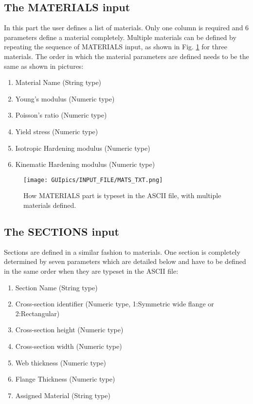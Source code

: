 \subsection{The MATERIALS input}
In this part the user defines a list of materials. Only one column is required 
and 6 parameters define a material completely. Multiple materials can be 
defined by repeating the sequence of MATERIALS input, as shown in Fig. 
\ref{fig:MATS} for three materials. The order in which the material parameters 
are defined needs to be the same as shown in pictures: 
\begin{enumerate}
	\item Material Name (String type)
	\item Young's modulus (Numeric type)
	\item Poisson's ratio (Numeric type)
	\item Yield stress (Numeric type)
	\item Isotropic Hardening modulus (Numeric type)
	\item Kinematic Hardening modulus (Numeric type)
\end{enumerate}

\begin{figure}[t]
	\centering
	\texttt{[image: GUIpics/INPUT\_FILE/MATS\_TXT.png]}
	\caption{How MATERIALS part is typeset in the ASCII file, with multiple 
	materials defined.}
	\label{fig:MATS}
\end{figure}

\subsection{The SECTIONS input}

Sections are defined in a similar fashion to materials. One section is 
completely determined by seven parameters which are detailed below and have to 
be defined in the same order when they are typeset in the ASCII file:

\begin{enumerate}
	\item Section Name (String type)
	\item Cross-section identifier (Numeric type, 1:Symmetric wide flange or 
	2:Rectangular)
	\item Cross-section height (Numeric type)
	\item Cross-section width (Numeric type)
	\item Web thickness (Numeric type)
	\item Flange Thickness (Numeric type)
	\item Assigned Material (String type)
\end{enumerate}

